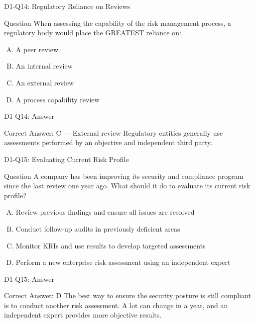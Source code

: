 \documentclass{beamer}
\begin{document}
	\begin{frame}{D1-Q14: Regulatory Reliance on Reviews}
		\begin{block}{Question}
			When assessing the capability of the risk management process, a regulatory body would place the GREATEST reliance on:
		\end{block}
		\begin{enumerate}[(A)]
			\item A peer review
			\item An internal review
			\item An external review
			\item A process capability review
		\end{enumerate}
	\end{frame}
	\begin{frame}{D1-Q14: Answer}
		\begin{block}{Correct Answer: C --- External review}
			Regulatory entities generally use assessments performed by an objective and independent third party.
		\end{block}
	\end{frame}
	
	\begin{frame}{D1-Q15: Evaluating Current Risk Profile}
		\begin{block}{Question}
			A company has been improving its security and compliance program since the last review one year ago. What should it do to evaluate its current risk profile?
		\end{block}
		\begin{enumerate}[(A)]
			\item Review previous findings and ensure all issues are resolved
			\item Conduct follow-up audits in previously deficient areas
			\item Monitor KRIs and use results to develop targeted assessments
			\item Perform a new enterprise risk assessment using an independent expert
		\end{enumerate}
	\end{frame}
	\begin{frame}{D1-Q15: Answer}
		\begin{block}{Correct Answer: D}
			The best way to ensure the security posture is still compliant is to conduct another risk assessment. A lot can change in a year, and an independent expert provides more objective results.
		\end{block}
	\end{frame}
	
\end{document}

